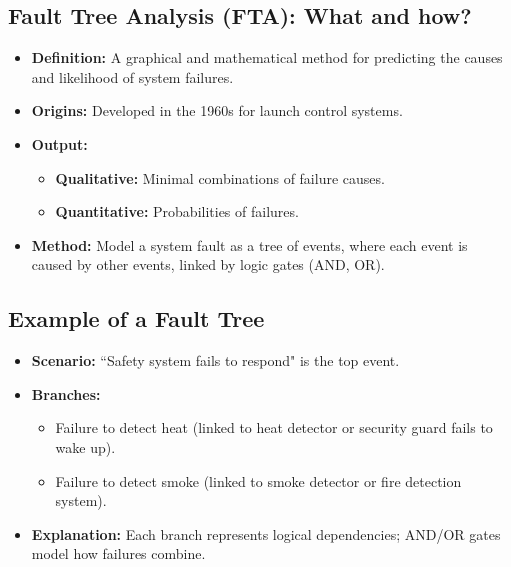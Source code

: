 \documentclass[11pt,a4paper]{article}
\begin{document}
\subsection*{Fault Tree Analysis (FTA): What and how?}
\begin{itemize}
    \item \textbf{Definition:} A graphical and mathematical method for predicting the causes and likelihood of system failures.
    \item \textbf{Origins:} Developed in the 1960s for launch control systems.
    \item \textbf{Output:} 
        \begin{itemize}
            \item \textbf{Qualitative:} Minimal combinations of failure causes.
            \item \textbf{Quantitative:} Probabilities of failures.
        \end{itemize}
    \item \textbf{Method:} Model a system fault as a tree of events, where each event is caused by other events, linked by logic gates (AND, OR).
\end{itemize}

\subsection*{Example of a Fault Tree}
\begin{itemize}
    \item \textbf{Scenario:} ``Safety system fails to respond" is the top event.
    \item \textbf{Branches:} 
        \begin{itemize}
            \item Failure to detect heat (linked to heat detector or security guard fails to wake up).
            \item Failure to detect smoke (linked to smoke detector or fire detection system).
        \end{itemize}
    \item \textbf{Explanation:} Each branch represents logical dependencies; AND/OR gates model how failures combine.
\end{itemize}
\end{document}
